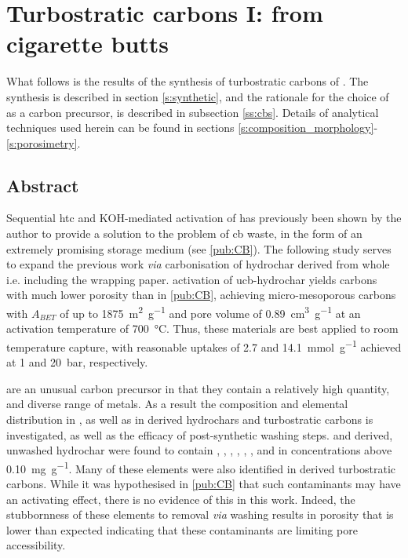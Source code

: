 \chapter{Turbostratic carbons I: from cigarette butts}
\label{ch:cbs}

What follows is the results of the synthesis of \glspl{turbostratic carbon} of . The synthesis is described in section \ref{s:synthetic}, and the rationale for the choice of  as a carbon precursor, is described in subsection \ref{ss:cbs}. Details of analytical techniques used herein can be found in sections \ref{s:composition_morphology}-\ref{s:porosimetry}.

\newpage
\section*{Abstract}

Sequential \gls{htc} and KOH-mediated activation of  has previously been shown by the author to provide a solution to the problem of \acrfull{cb} waste, in the form of an extremely promising  storage medium (see \ref{pub:CB}). The following study serves to expand the previous work \textit{via} carbonisation of \gls{hydrochar} derived from whole  i.e. including the wrapping paper.  activation of \acrshort{ucb}-\gls{hydrochar} yields carbons with much lower porosity than in \ref{pub:CB}, achieving micro-mesoporous carbons with $A_{BET}$ of up to \qty{1875}{\metre\squared\per\gram} and pore volume of \qty{0.89}{\cm\cubed\per\gram} at an activation temperature of \qty{700}{\degreeCelsius}. Thus, these materials are best applied to room temperature  capture, with reasonable uptakes of \num{2.7} and \qty{14.1}{\milli\mole\per\gram} achieved at 1 and \qty{20}{\bar}, respectively.

 are an unusual carbon precursor in that they contain a relatively high quantity, and diverse range of metals. As a result the composition and elemental distribution in , as well as in derived \glspl{hydrochar} and \glspl{turbostratic carbon} is investigated, as well as the efficacy of post-synthetic washing steps.  and derived, unwashed \gls{hydrochar} were found to contain , , , , , , and  in concentrations above \qty{0.10}{\mg\per\gram}. Many of these elements were also identified in derived \glspl{turbostratic carbon}. While it was hypothesised in \ref{pub:CB} that such contaminants may have an activating effect, there is no evidence of this in this work. Indeed, the stubbornness of these elements to removal \textit{via}  washing results in porosity that is lower than expected indicating that these contaminants are limiting pore accessibility.

